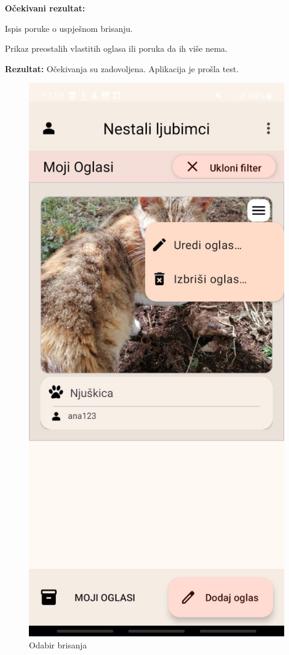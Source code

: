 			\noindent \textbf{Očekivani rezultat: }
			\begin{packed_enum}
				\item	[]\begin{packed_enum}
					\item	 Ispis poruke o uspješnom brisanju.
					\item Prikaz preostalih vlastitih oglasa ili poruka da ih više nema.
				\end{packed_enum}	
			\end{packed_enum}	

			\noindent \textbf{Rezultat:} Očekivanja su zadovoljena. Aplikacija je prošla test.

			\begin{figure}[H]
			\centering
			\begin{minipage}{.5\textwidth}
	 			 \centering
				  \includegraphics[width=.58\linewidth]{slike/app4v1.jpg}
				  \caption{Odabir brisanja}
				  \label{fig:app4v1}
			\end{minipage}%
			\begin{minipage}{.5\textwidth}

\end{minipage}
\end{figure}
